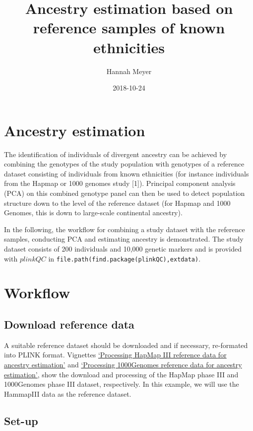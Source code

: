 \documentclass[]{article}
\title{Ancestry estimation based on reference samples of known ethnicities}
\author{Hannah Meyer}
\date{2018-10-24}
\begin{document}
\maketitle

{
\setcounter{tocdepth}{2}
\tableofcontents
}
\section{Ancestry estimation}\label{ancestry-estimation}

The identification of individuals of divergent ancestry can be achieved
by combining the genotypes of the study population with genotypes of a
reference dataset consisting of individuals from known ethnicities (for
instance individuals from the Hapmap or 1000 genomes study {[}1{]}).
Principal component analysis (PCA) on this combined genotype panel can
then be used to detect population structure down to the level of the
reference dataset (for Hapmap and 1000 Genomes, this is down to
large-scale continental ancestry).

In the following, the workflow for combining a study dataset with the
reference samples, conducting PCA and estimating ancestry is
demonstrated. The study dataset consists of 200 individuals and 10,000
genetic markers and is provided with \(plinkQC\) in
\texttt{file.path(find.package(\textquotesingle{}plinkQC\textquotesingle{}),\textquotesingle{}extdata\textquotesingle{})}.

\section{Workflow}\label{workflow}

\subsection{Download reference data}\label{download-reference-data}

A suitable reference dataset should be downloaded and if necessary,
re-formated into PLINK format. Vignettes
\href{https://hannahvmeyer.github.io/plinkQC/articles/HapMap.html}{`Processing
HapMap III reference data for ancestry estimation'} and
\href{}{`Processing 1000Genomes reference data for ancestry
estimation'}, show the download and processing of the HapMap phase III
and 1000Genomes phase III dataset, respectively. In this example, we
will use the HammapIII data as the reference dataset.

\subsection{Set-up}\label{set-up}
\end{document}
